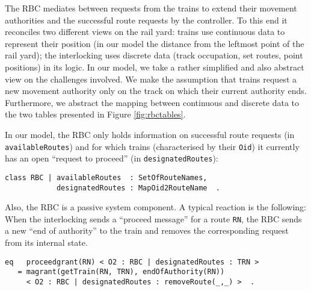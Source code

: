 The RBC mediates between requests from the trains to extend their
movement authorities and the successful route requests by the
controller. To this end it reconciles two different views on the rail
yard: trains use continuous data to represent their position (in our
model the distance from the leftmost point of the rail yard); the
interlocking uses discrete data (track occupation, set routes, point
positions) in its logic.
%
In our model, we take a rather simplified and also abstract view on
the challenges involved. We make the assumption that trains request a
new movement authority only on the track on which their current
authority ends. Furthermore, we abstract the mapping between
continuous and discrete data to the two tables presented in Figure
\ref{fig:rbctables}.

In our model, the RBC only holds information on successful route
requests (in \verb|availableRoutes|) and for which trains
(characterised by their \verb|Oid|) it currently has an open ``request
to proceed'' (in \verb|designatedRoutes|):
%
\begin{lstlisting}[columns=fixed]
class RBC | availableRoutes  : SetOfRouteNames, 
            designatedRoutes : MapOid2RouteName  .
\end{lstlisting}

Also, the RBC is a passive system component. A typical reaction is the
following: When the interlocking sends a ``proceed message'' for a
route \verb|RN|, the RBC sends a new ``end of authority'' to the train
and removes the corresponding request from its internal state.
%
\begin{lstlisting}[columns=fixed]
eq   proceedgrant(RN) < O2 : RBC | designatedRoutes : TRN > 
   = magrant(getTrain(RN, TRN), endOfAuthority(RN)) 
     < O2 : RBC | designatedRoutes : removeRoute(_,_) >  . 
\end{lstlisting}
